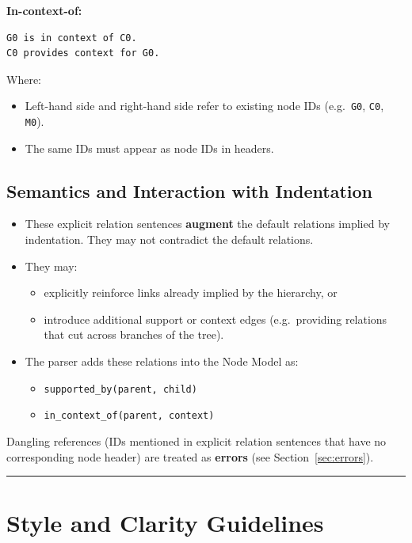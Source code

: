 \documentclass[11pt]{article}
\begin{document}
\textbf{In-context-of:}
\begin{verbatim}
G0 is in context of C0.
C0 provides context for G0.
\end{verbatim}

Where:
\begin{itemize}[leftmargin=2em]
  \item Left-hand side and right-hand side refer to existing node IDs (e.g.\ \texttt{G0}, \texttt{C0}, \texttt{M0}).
  \item The same IDs must appear as node IDs in headers.
\end{itemize}

\subsection{Semantics and Interaction with Indentation}

\begin{itemize}[leftmargin=2em]
  \item These explicit relation sentences \textbf{augment} the default relations implied by indentation. They may not contradict the default relations.
  \item They may:
  \begin{itemize}[leftmargin=1.5em]
    \item explicitly reinforce links already implied by the hierarchy, or
    \item introduce additional support or context edges (e.g.\ providing relations that cut across branches of the tree).
  \end{itemize}
  \item The parser adds these relations into the Node Model as:
  \begin{itemize}[leftmargin=1.5em]
    \item \texttt{supported\_by(parent, child)}
    \item \texttt{in\_context\_of(parent, context)}
  \end{itemize}
\end{itemize}

Dangling references (IDs mentioned in explicit relation sentences that have no corresponding node header) are treated as \textbf{errors} (see Section~\ref{sec:errors}).

\bigskip
\hrule
\bigskip

\section{Style and Clarity Guidelines}
\end{document}

